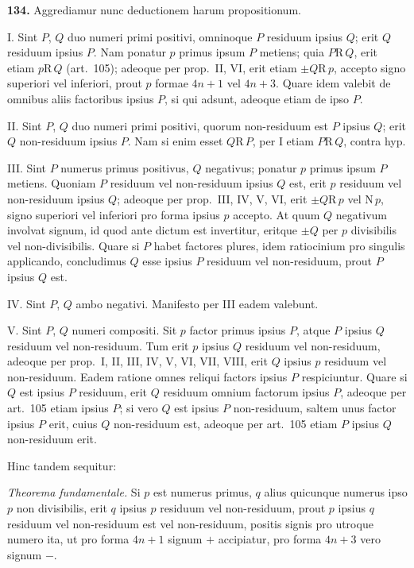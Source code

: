 \documentclass[12pt,a4paper]{article}
\newcommand{\R}{\mbox{R}}
\newcommand{\N}{\mbox{N}}
\begin{document}
\textbf{134.}
Aggrediamur nunc deductionem harum propositionum.

I. Sint $P$, $Q$ duo numeri primi positivi, omninoque $P$ residuum ipsius
$Q$; erit $Q$ residuum ipsius $P$. Nam ponatur $p$ primus ipsum $P$ metiens;
quia $P \R\, Q$, erit etiam $p \R\, Q$ (art.~105); adeoque per prop.~II, VI, erit etiam
$\pm Q \R\, p$, accepto signo superiori vel inferiori, prout $p$ formae $4n+1$ vel $4n+3$.
Quare idem valebit de omnibus aliis factoribus ipsius $P$, si qui adsunt, adeoque
etiam de ipso $P$.

II. Sint $P$, $Q$ duo numeri primi positivi, quorum non-residuum est $P$
ipsius $Q$; erit $Q$ non-residuum ipsius $P$. Nam si enim esset $Q \R\, P$, per I
etiam $P \R\, Q$, contra hyp.

III. Sint $P$ numerus primus positivus, $Q$ negativus; ponatur $p$ primus
ipsum $P$ metiens. Quoniam $P$ residuum vel non-residuum ipsius $Q$ est, erit
$p$ residuum vel non-residuum ipsius $Q$; adeoque per prop.~III, IV, V, VI,
erit $\pm Q \R\, p$ vel $\N\, p$, signo superiori vel inferiori pro forma ipsius $p$ accepto.
At quum $Q$ negativum involvat signum, id quod ante dictum est invertitur,
eritque $\pm Q$ per $p$ divisibilis vel non-divisibilis. Quare si $P$ habet factores
plures, idem ratiocinium pro singulis applicando, concludimus $Q$ esse ipsius $P$
residuum vel non-residuum, prout $P$ ipsius $Q$ est.

IV. Sint $P$, $Q$ ambo negativi. Manifesto per III eadem valebunt.

V. Sint $P$, $Q$ numeri compositi. Sit $p$ factor primus ipsius $P$, atque
$P$ ipsius $Q$ residuum vel non-residuum. Tum erit $p$ ipsius $Q$ residuum vel
non-residuum, adeoque per prop.~I, II, III, IV, V, VI, VII, VIII, erit $Q$ ipsius
$p$ residuum vel non-residuum. Eadem ratione omnes reliqui factors ipsius $P$
respiciuntur. Quare si $Q$ est ipsius $P$ residuum, erit $Q$ residuum omnium
factorum ipsius $P$, adeoque per art.~105 etiam ipsius $P$; si vero $Q$ est ipsius
$P$ non-residuum, saltem unus factor ipsius $P$ erit, cuius $Q$ non-residuum est,
adeoque per art.~105 etiam $P$ ipsius $Q$ non-residuum erit.

Hinc tandem sequitur:

\textit{Theorema fundamentale.} Si $p$ est numerus primus, $q$ alius quicunque
numerus ipso $p$ non divisibilis, erit $q$ ipsius $p$ residuum vel non-residuum, prout
$p$ ipsius $q$ residuum vel non-residuum est vel non-residuum, positis signis pro
utroque numero ita, ut pro forma $4n+1$ signum $+$ accipiatur, pro forma
$4n+3$ vero signum $-$.
\end{document}
